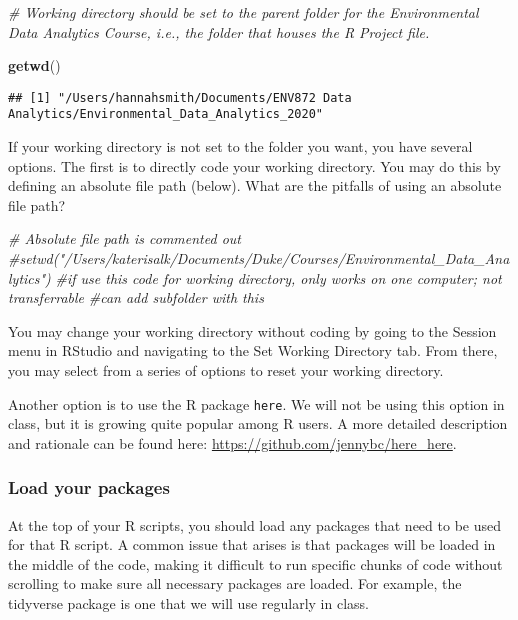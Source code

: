 \documentclass[]{article}
\newenvironment{Shaded}{\begin{snugshade}}{\end{snugshade}}
\newcommand{\CommentTok}[1]{\textcolor[rgb]{0.56,0.35,0.01}{\textit{#1}}}
\newcommand{\KeywordTok}[1]{\textcolor[rgb]{0.13,0.29,0.53}{\textbf{#1}}}
\newcommand{\NormalTok}[1]{#1}
\begin{document}
\begin{Shaded}
\begin{Highlighting}[]
\CommentTok{# Working directory should be set to the parent folder for the Environmental Data Analytics Course, i.e., the folder that houses the R Project file.}

\KeywordTok{getwd}\NormalTok{()}
\end{Highlighting}
\end{Shaded}

\begin{verbatim}
## [1] "/Users/hannahsmith/Documents/ENV872 Data Analytics/Environmental_Data_Analytics_2020"
\end{verbatim}

If your working directory is not set to the folder you want, you have
several options. The first is to directly code your working directory.
You may do this by defining an absolute file path (below). What are the
pitfalls of using an absolute file path?

\begin{Shaded}
\begin{Highlighting}[]
\CommentTok{# Absolute file path is commented out}
\CommentTok{#setwd("/Users/katerisalk/Documents/Duke/Courses/Environmental_Data_Analytics")}
\CommentTok{#if use this code for working directory, only works on one computer; not transferrable}
\CommentTok{#can add subfolder with this}
\end{Highlighting}
\end{Shaded}

You may change your working directory without coding by going to the
Session menu in RStudio and navigating to the Set Working Directory tab.
From there, you may select from a series of options to reset your
working directory.

Another option is to use the R package \texttt{here}. We will not be
using this option in class, but it is growing quite popular among R
users. A more detailed description and rationale can be found here:
\url{https://github.com/jennybc/here_here}.

\hypertarget{load-your-packages}{%
\subsubsection{Load your packages}\label{load-your-packages}}

At the top of your R scripts, you should load any packages that need to
be used for that R script. A common issue that arises is that packages
will be loaded in the middle of the code, making it difficult to run
specific chunks of code without scrolling to make sure all necessary
packages are loaded. For example, the tidyverse package is one that we
will use regularly in class.
\end{document}
